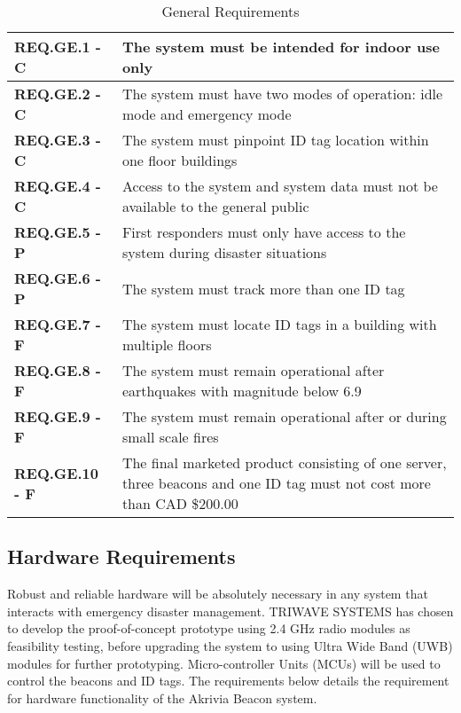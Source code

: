\bgroup
\def\arraystretch{1.5}
\begin{table}[H]
\centering
\begin{tabular}{ | m{3.25cm} | m{12.5cm} |}
 \hline
 \textbf{REQ.GE.1 - C} & The system must be intended for indoor use only \\
\hline
 \textbf{REQ.GE.2 - C} & The system must have two modes of operation: idle mode and emergency mode \\
\hline
 \textbf{REQ.GE.3 - C} & The system must pinpoint ID tag location within one floor buildings \\
\hline
 \textbf{REQ.GE.4 - C} & Access to the system and system data must not be available to the general public \\
\hline
 \textbf{REQ.GE.5 - P} & First responders must only have access to the system during disaster situations \\
\hline
 \textbf{REQ.GE.6 - P} & The system must track more than one ID tag \\
\hline
 \textbf{REQ.GE.7 - F} & The system must locate ID tags in a building with multiple floors \\
\hline
 \textbf{REQ.GE.8 - F} & The system must remain operational after earthquakes with magnitude below 6.9 \\
\hline
 \textbf{REQ.GE.9 - F} & The system must remain operational after or during small scale fires \\
\hline
 \textbf{REQ.GE.10 - F} & The final marketed product consisting of one server, three beacons and one ID tag must not cost more than CAD \$200.00 \\
\hline
\end{tabular}
\caption{General Requirements}
\end{table}

\break
\subsection{Hardware Requirements}
Robust and reliable hardware will be absolutely necessary in any system that interacts with emergency disaster management. TRIWAVE SYSTEMS has chosen to develop the proof-of-concept prototype using 2.4 GHz radio modules as feasibility testing, before upgrading the system to using Ultra Wide Band (UWB) modules for further prototyping. Micro-controller Units (MCUs) will be used to control the beacons and ID tags. The requirements below details the requirement for hardware functionality of the Akrivia Beacon system.

